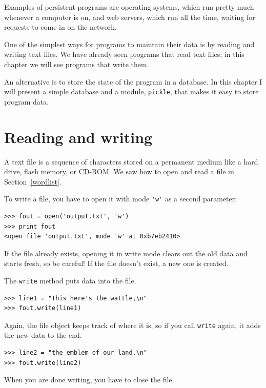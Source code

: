 \documentclass[10pt]{book}
\begin{document}
{Examples of persistent programs are operating systems, which
run pretty much whenever a computer is on, and web servers,
which run all the time, waiting for requests to come in on
the network.

One of the simplest ways for programs to maintain their data
is by reading and writing text files.  We have already seen
programs that read text files; in this chapter we will see programs
that write them.

An alternative is to store the state of the program in a database.
In this chapter I will present a simple database and a module,
{\tt pickle}, that makes it easy to store program data.



\section{Reading and writing}


A text file is a sequence of characters stored on a permanent
medium like a hard drive, flash memory, or CD-ROM.  We saw how
to open and read a file in Section~\ref{wordlist}.


To write a file, you have to open it with mode
\verb"'w'" as a second parameter:

\beforeverb
\begin{verbatim}
>>> fout = open('output.txt', 'w')
>>> print fout
<open file 'output.txt', mode 'w' at 0xb7eb2410>
\end{verbatim}
\afterverb
%
If the file already exists, opening it in write mode clears out
the old data and starts fresh, so be careful!
If the file doesn't exist, a new one is created.

The {\tt write} method puts data into the file.

\beforeverb
\begin{verbatim}
>>> line1 = "This here's the wattle,\n"
>>> fout.write(line1)
\end{verbatim}
\afterverb
%
Again, the file object keeps track of where it is, so if
you call {\tt write} again, it adds the new data to the end.

\beforeverb
\begin{verbatim}
>>> line2 = "the emblem of our land.\n"
>>> fout.write(line2)
\end{verbatim}
\afterverb
%
When you are done writing, you have to close the file.

}
\end{document}
